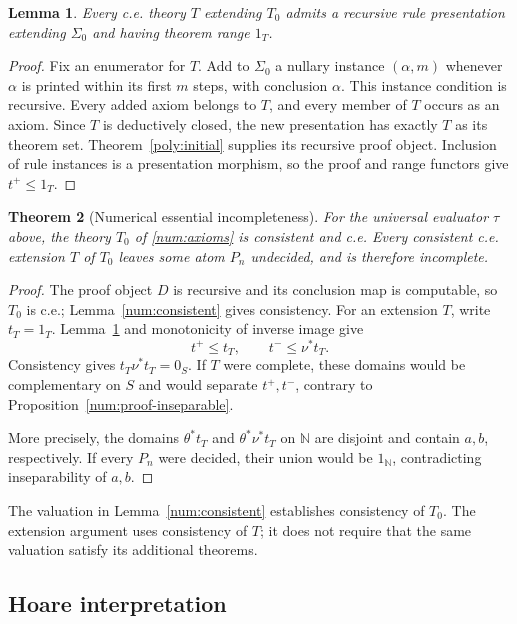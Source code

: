 \documentclass[11pt]{article}
\newtheorem{theorem}{Theorem}[section]
\newtheorem{lemma}[theorem]{Lemma}
\theoremstyle{definition}
\theoremstyle{remark}
\newcommand{\N}{\mathbb N}
\begin{document}
\begin{lemma}\label{num:effective-proofs}
Every c.e. theory $T$ extending $T_0$ admits a recursive rule
presentation extending $\Sigma_0$ and having theorem range $1_T$.
\end{lemma}
\begin{proof}
Fix an enumerator for $T$. Add to $\Sigma_0$ a nullary instance
$(\alpha,m)$ whenever $\alpha$ is printed within its first $m$ steps,
with conclusion $\alpha$. This instance condition is recursive.
Every added axiom belongs to $T$, and every member of $T$ occurs as an
axiom. Since $T$ is deductively closed, the new presentation has exactly
$T$ as its theorem set. Theorem~\ref{poly:initial} supplies its recursive
proof object. Inclusion of rule instances is a presentation morphism,
so the proof and range functors give $t^+\le1_T$.
\end{proof}

\begin{theorem}[Numerical essential incompleteness]\label{num:essential}
For the universal evaluator $\tau$ above, the theory $T_0$ of
\eqref{num:axioms} is consistent and c.e. Every consistent c.e. extension
$T$ of $T_0$ leaves some atom $P_n$ undecided, and is therefore incomplete.
\end{theorem}
\begin{proof}
The proof object $D$ is recursive and its conclusion map is computable,
so $T_0$ is c.e.; Lemma~\ref{num:consistent} gives consistency.
For an extension $T$, write $t_T=1_T$.
Lemma~\ref{num:effective-proofs} and monotonicity of inverse image give
\[
 t^+\le t_T,\qquad t^-\le\nu^*t_T.
\]
Consistency gives $t_T\nu^*t_T=0_S$. If $T$ were complete, these domains
would be complementary on $S$ and would separate $t^+,t^-$, contrary to
Proposition~\ref{num:proof-inseparable}.

More precisely, the domains
$\theta^*t_T$ and $\theta^*\nu^*t_T$ on $\N$ are disjoint and contain
$a,b$, respectively. If every $P_n$ were decided, their union would be
$1_{\N}$, contradicting inseparability of $a,b$.
\end{proof}

The valuation in Lemma~\ref{num:consistent} establishes consistency of
$T_0$. The extension argument uses consistency of $T$; it does not require
that the same valuation satisfy its additional theorems.

\subsection{Hoare interpretation}
\end{document}
